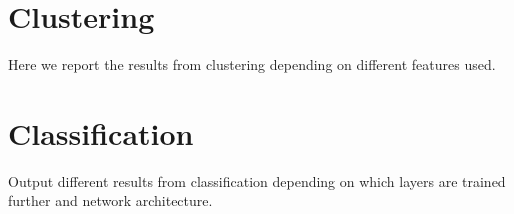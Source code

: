 \section{Clustering}
Here we report the results from clustering depending on different features used.

\section{Classification}
Output different results from classification depending on which layers are trained further and network architecture.






